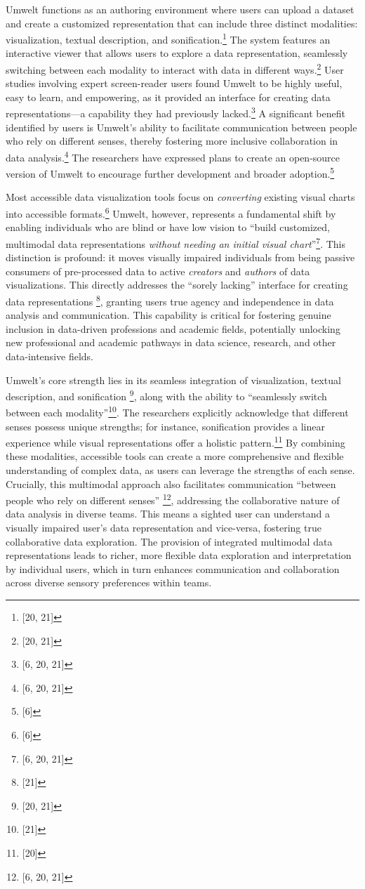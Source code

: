 Umwelt functions as an authoring environment where users can upload a dataset and create a customized representation that can include three distinct modalities: visualization, textual description, and sonification.\footnote{[20, 21]} The system features an interactive viewer that allows users to explore a data representation, seamlessly switching between each modality to interact with data in different ways.\footnote{[20, 21]} User studies involving expert screen-reader users found Umwelt to be highly useful, easy to learn, and empowering, as it provided an interface for creating data representations---a capability they had previously lacked.\footnote{[6, 20, 21]} A significant benefit identified by users is Umwelt's ability to facilitate communication between people who rely on different senses, thereby fostering more inclusive collaboration in data analysis.\footnote{[6, 20, 21]} The researchers have expressed plans to create an open-source version of Umwelt to encourage further development and broader adoption.\footnote{[6]}

Most accessible data visualization tools focus on \textit{converting} existing visual charts into accessible formats.\footnote{[6]} Umwelt, however, represents a fundamental shift by enabling individuals who are blind or have low vision to ``build customized, multimodal data representations \textit{without needing an initial visual chart}''\footnote{[6, 20, 21]}. This distinction is profound: it moves visually impaired individuals from being passive consumers of pre-processed data to active \textit{creators} and \textit{authors} of data visualizations. This directly addresses the ``sorely lacking'' interface for creating data representations \footnote{[21]}, granting users true agency and independence in data analysis and communication. This capability is critical for fostering genuine inclusion in data-driven professions and academic fields, potentially unlocking new professional and academic pathways in data science, research, and other data-intensive fields.

Umwelt's core strength lies in its seamless integration of visualization, textual description, and sonification \footnote{[20, 21]}, along with the ability to ``seamlessly switch between each modality''\footnote{[21]}. The researchers explicitly acknowledge that different senses possess unique strengths; for instance, sonification provides a linear experience while visual representations offer a holistic pattern.\footnote{[20]} By combining these modalities, accessible tools can create a more comprehensive and flexible understanding of complex data, as users can leverage the strengths of each sense. Crucially, this multimodal approach also facilitates communication ``between people who rely on different senses'' \footnote{[6, 20, 21]}, addressing the collaborative nature of data analysis in diverse teams. This means a sighted user can understand a visually impaired user's data representation and vice-versa, fostering true collaborative data exploration. The provision of integrated multimodal data representations leads to richer, more flexible data exploration and interpretation by individual users, which in turn enhances communication and collaboration across diverse sensory preferences within teams.

